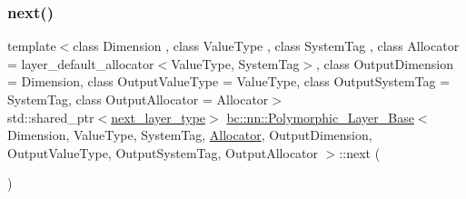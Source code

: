 \mbox{\label{structbc_1_1nn_1_1Polymorphic__Layer__Base_afe77ff310be16c9357ea66bec8d6306b}} 
\subsubsection{\texorpdfstring{next()}{next()}\hspace{0.1cm}{\footnotesize\ttfamily [2/4]}}
{\footnotesize\ttfamily template$<$class Dimension , class Value\+Type , class System\+Tag , class Allocator  = layer\+\_\+default\+\_\+allocator$<$\+Value\+Type, System\+Tag$>$, class Output\+Dimension  = Dimension, class Output\+Value\+Type  = Value\+Type, class Output\+System\+Tag  = System\+Tag, class Output\+Allocator  = Allocator$>$ \\
std\+::shared\+\_\+ptr$<$\hyperlink{structbc_1_1nn_1_1Polymorphic__Layer__Base_ac7d70db83e8370d2975d05401713f677}{next\+\_\+layer\+\_\+type}$>$ \hyperlink{structbc_1_1nn_1_1Polymorphic__Layer__Base}{bc\+::nn\+::\+Polymorphic\+\_\+\+Layer\+\_\+\+Base}$<$ Dimension, Value\+Type, System\+Tag, \hyperlink{classbc_1_1allocators_1_1Allocator}{Allocator}, Output\+Dimension, Output\+Value\+Type, Output\+System\+Tag, Output\+Allocator $>$\+::next (\begin{DoxyParamCaption}{ }\end{DoxyParamCaption})\hspace{0.3cm}{\ttfamily [inline]}}

\mbox{\label{structbc_1_1nn_1_1Polymorphic__Layer__Base_a042ca1b5f4e9c78fa9953e3f310972a5}} 
